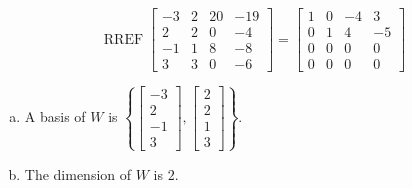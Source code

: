 \begin{exerciseAnswer} 


\[\operatorname{RREF} \left[\begin{array}{cccc}
-3 & 2 & 20 & -19 \\
2 & 2 & 0 & -4 \\
-1 & 1 & 8 & -8 \\
3 & 3 & 0 & -6
\end{array}\right] = \left[\begin{array}{cccc}
1 & 0 & -4 & 3 \\
0 & 1 & 4 & -5 \\
0 & 0 & 0 & 0 \\
0 & 0 & 0 & 0
\end{array}\right] \]


\begin{enumerate}[(a)]
\item A basis of \(W\) is \( \left\{ \left[\begin{array}{c}
-3 \\
2 \\
-1 \\
3
\end{array}\right] , \left[\begin{array}{c}
2 \\
2 \\
1 \\
3
\end{array}\right] \right\} \).
\item The dimension of \(W\) is \( 2 \).
\end{enumerate}
    
\end{exerciseAnswer}
    
